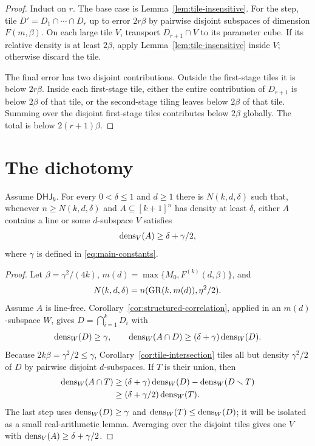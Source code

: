\begin{proof}
Induct on $r$.  The base case is Lemma~\ref{lem:tile-insensitive}.  For the step, tile
$D'=D_1\cap\cdots\cap D_r$ up to error $2r\beta$ by pairwise disjoint subspaces of dimension
$F(m,\beta)$.  On each large tile $V$, transport $D_{r+1}\cap V$ to its parameter cube.  If its
relative density is at least $2\beta$, apply Lemma~\ref{lem:tile-insensitive} inside $V$; otherwise
discard the tile.

The final error has two disjoint contributions.  Outside the first-stage tiles it is below
$2r\beta$.  Inside each first-stage tile, either the entire contribution of $D_{r+1}$ is below
$2\beta$ of that tile, or the second-stage tiling leaves below $2\beta$ of that tile.  Summing over
the disjoint first-stage tiles contributes below $2\beta$ globally.  The total is below
$2(r+1)\beta$.
\end{proof}

\section{The dichotomy}

\begin{proposition}
\label{prop:density-increment}
Assume $\mathsf{DHJ}_k$.  For every $0<\delta\leq1$ and $d\geq1$ there is $N(k,d,\delta)$ such
that, whenever $n\geq N(k,d,\delta)$ and $A\subseteq[k+1]^n$ has density at least $\delta$, either
$A$ contains a line or some $d$-subspace $V$ satisfies
\[
  \operatorname{dens}_V(A)\geq\delta+\gamma/2,
\]
where $\gamma$ is defined in \eqref{eq:main-constants}.
\end{proposition}

\begin{proof}
Let $\beta=\gamma^2/(4k)$,
$m(d)=\max\{M_0,F^{(k)}(d,\beta)\}$, and
\[
 N(k,d,\delta)=n(\operatorname{GR}(k,m(d)),\eta^2/2).
\]
Assume $A$ is line-free.  Corollary~\ref{cor:structured-correlation}, applied in an
$m(d)$-subspace $W$, gives $D=\bigcap_{i=1}^kD_i$ with
\[
 \operatorname{dens}_W(D)\geq\gamma,
 \qquad
 \operatorname{dens}_W(A\cap D)\geq(\delta+\gamma)\operatorname{dens}_W(D).
\]
Because $2k\beta=\gamma^2/2\leq\gamma$, Corollary~\ref{cor:tile-intersection} tiles all but density
$\gamma^2/2$ of $D$ by pairwise disjoint $d$-subspaces.  If $T$ is their union, then
\begin{align*}
 \operatorname{dens}_W(A\cap T)
 &\geq(\delta+\gamma)\operatorname{dens}_W(D)-\operatorname{dens}_W(D\smallsetminus T)\\
 &\geq(\delta+\gamma/2)\operatorname{dens}_W(T).
\end{align*}
The last step uses $\operatorname{dens}_W(D)\geq\gamma$ and $\operatorname{dens}_W(T)\leq\operatorname{dens}_W(D)$; it will be isolated as a
small real-arithmetic lemma.  Averaging over the disjoint tiles gives one $V$ with
$\operatorname{dens}_V(A)\geq\delta+\gamma/2$.
\end{proof}


